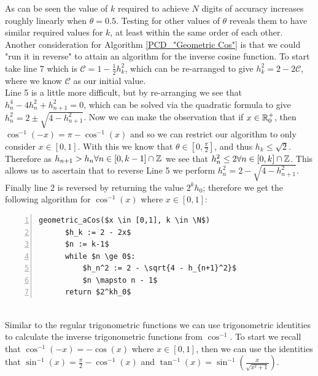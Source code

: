 {As can be seen the value of \(k\) required to achieve \(N\) digits of accuracy increases roughly linearly when \(\theta = 0.5\). Testing for other values of \(\theta\) reveals them to have similar required values for \(k\), at least within the same order of each other.\\

Another consideration for Algorithm \ref{PCD_"Geometric Cos"} is that we could "run it in reverse" to attain an algorithm for the inverse cosine function. To start take line 7 which is \(\mathcal{C} = 1 - \frac{1}{2}h_k^2\), which can be re-arranged to give \(h_k^2 = 2 - 2\mathcal{C}\), where we know \(\mathcal{C}\) as our initial value.\\

Line 5 is a little more difficult, but by re-arranging we see that \(h_n^4 - 4h_n^2 + h_{n+1}^2 = 0\), which can be solved via the quadratic formula to give \(h_n^2 = 2 \pm \sqrt{4 - h_{n+1}^2}\). Now we can make the observation that if \(x \in \mathbb{R}^+_0\), then \(\cos^{-1}(-x) = \pi - \cos^{-1}(x)\) and so we can restrict our algorithm to only consider \(x \in [0,1]\). With this we know that \(\theta \in [0,\frac{\pi}{2}]\), and thus \(h_k \le \sqrt{2}\). Therefore as \(h_{n+1} > h_n \forall n \in [0,k-1]\cap\mathbb{Z}\) we see that \(h_n^2 \le 2 \forall n \in [0,k]\cap\mathbb{Z}\). This allows us to ascertain that to reverse Line 5 we perform \(h_n^2 = 2 - \sqrt{4 - h_{n+1}^2}\).\\

Finally line 2 is reversed by returning the value \(2^kh_0\); therefore we get the following algorithm for \(\cos^{-1}(x)\) where \(x \in [0,1]\):

\begin{lstlisting}[numbers=left,frame=single,mathescape,caption={Geometric calculation of \(\cos^{-1}\)},label={PCD_"Geometric aCos"}]
  geometric_aCos($x \in [0,1], k \in \N$)
      $h_k := 2 - 2x$
      $n := k-1$
      while $n \ge 0$:
          $h_n^2 := 2 - \sqrt{4 - h_{n+1}^2}$
          $n \mapsto n - 1$
      return $2^kh_0$
\end{lstlisting}\\

Similar to the regular trigonometric functions we can use trigonometric identities to calculate the inverse trigonometric functions from \(\cos^{-1}\). To start we recall that \(\cos^{-1}(-x) = -\cos(x)\) where \(x \in [0,1]\), then we can use the identities that \(\sin^{-1}(x) = \frac{\pi}{2} - \cos^{-1}(x)\) and \(\tan^{-1}(x) = \sin^{-1}(\frac{x}{\sqrt{x^2 + 1}})\).\\

}
